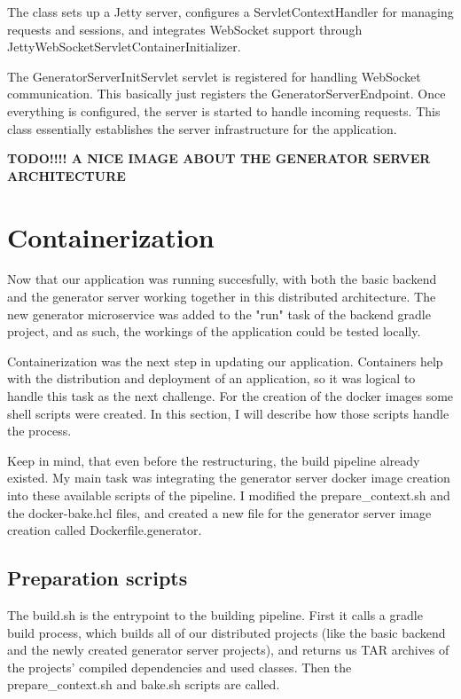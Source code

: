 		The class sets up a Jetty server, configures a ServletContextHandler for managing requests and sessions, 
		and integrates WebSocket support through JettyWebSocketServletContainerInitializer.

		The GeneratorServerInitServlet servlet is registered for handling WebSocket communication.
		This basically just registers the GeneratorServerEndpoint.
		Once everything is configured, the server is started to handle incoming requests. 
		This class essentially establishes the server infrastructure for the application.

		\textbf{TODO!!!! A NICE IMAGE ABOUT THE GENERATOR SERVER ARCHITECTURE}

	\section{Containerization}
		Now that our application was running succesfully, with both the basic backend and the generator server working together in this distributed architecture. 
		The new generator microservice was added 
		to the "run" task of the backend gradle project, and as such, the workings of the application could be tested locally. 
		
		Containerization was the next step in 
		updating our application. Containers help with the distribution and deployment of an application, so it was logical to handle this task as the next challenge.
		For the creation of the docker images some shell scripts were created. In this section, I will describe how those scripts handle the process.

		Keep in mind, that even before the restructuring, the build pipeline already existed. My main task was integrating the generator server docker image creation
		into these available scripts of the pipeline. I modified the prepare\_context.sh and the docker-bake.hcl files, and created a new file for the generator server
		image creation called Dockerfile.generator.

		\subsection{Preparation scripts}
			The build.sh is the entrypoint to the building pipeline. First it calls a gradle build process, which builds all of our distributed projects 
			(like the basic backend
			and the newly created generator server projects), and returns us TAR archives of the projects' compiled dependencies and used classes.
			Then the prepare\_context.sh and bake.sh scripts are called.

